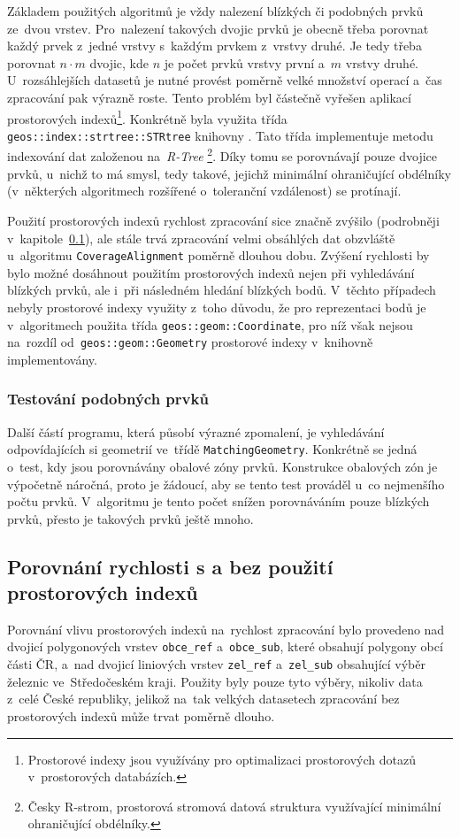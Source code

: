 Základem použitých algoritmů je vždy nalezení blízkých či podobných prvků 
ze~dvou vrstev. Pro~nalezení takových dvojic prvků je obecně třeba porovnat 
každý prvek z~jedné vrstvy s~každým prvkem z~vrstvy druhé. Je tedy třeba 
porovnat $n\cdot m$ dvojic, kde $n$ je počet prvků vrstvy první a~$m$ vrstvy 
druhé. U~rozsáhlejších datasetů je nutné provést poměrně velké množství 
operací a~čas zpracování pak výrazně roste. Tento problém byl částečně vyřešen 
aplikací prostorových indexů\footnote{Prostorové indexy jsou využívány pro 
optimalizaci prostorových dotazů v~prostorových databázích.}. Konkrétně byla 
využita třída \texttt{geos::index::strtree::STRtree} knihovny  .
Tato třída implementuje metodu indexování dat založenou na~\textit{R-Tree}
\footnote{Česky R-strom, prostorová stromová datová struktura využívající 
minimální ohraničující obdélníky.}. Díky tomu se porovnávají pouze dvojice prvků, 
u~nichž to má smysl, tedy takové, jejichž minimální ohraničující obdélníky 
(v~některých algoritmech rozšířené o~toleranční vzdálenost) se protínají. 

Použití prostorových indexů rychlost zpracování sice značně zvýšilo (podrobněji 
v~kapitole~\ref{problemy-test}), ale stále trvá zpracování velmi obsáhlých dat 
obzvláště u~algo\-ritmu \texttt{Coverage\-Alignment} poměrně 
dlouhou dobu. Zvýšení rychlosti by bylo možné dosáhnout použitím prostorových 
indexů nejen při vyhledávání blízkých prvků, ale i~při následném hledání 
blízkých bodů. V~těchto případech nebyly prostorové indexy využity z~toho 
důvodu, že pro reprezentaci bodů je v~algoritmech použita třída 
\texttt{geos::geom::Coordinate}, pro níž však nejsou na~rozdíl 
od~\texttt{geos::geom::Geometry} prostorové indexy v~knihovně 
 implementovány.

\subsubsection{Testování podobných prvků}

Další částí programu, která působí výrazné zpomalení, je vyhledávání
odpovídajících si geometrií ve~třídě \texttt{MatchingGeometry}. Konkrétně
se jedná o~test, kdy jsou porovnávány obalové zóny prvků. Konstrukce
obalových zón je výpočetně náročná, proto je žádoucí, aby se tento test
prováděl u~co nejmenšího počtu prvků. V~algoritmu je tento počet snížen
porovnáváním pouze blízkých prvků, přesto je takových prvků ještě mnoho.


\subsection{Porovnání rychlosti s a bez použití prostorových indexů}
\label{problemy-test}
Porovnání vlivu prostorových indexů na~rychlost zpracování bylo provedeno 
nad dvojicí polygonových vrstev \texttt{obce\_ref} a~\texttt{obce\_sub}, 
které obsahují polygony obcí části ČR, a~nad dvojicí li\-niových vrstev 
\texttt{zel\_ref} a~\texttt{zel\_sub} obsahující výběr železnic ve~Středočeském 
kraji. Použity byly pouze tyto výběry, nikoliv data z~celé České republiky,
jelikož na~tak velkých datasetech zpracování bez prostorových indexů může 
trvat poměrně dlouho.

